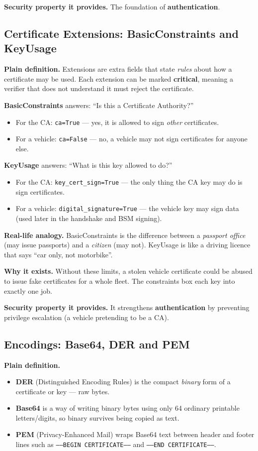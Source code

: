 \documentclass[11pt,a4paper]{article}
\begin{document}
\textbf{Security property it provides.} The foundation of \textbf{authentication}.

\subsection{Certificate Extensions: BasicConstraints and KeyUsage}
\textbf{Plain definition.} Extensions are extra fields that state \emph{rules}
about how a certificate may be used. Each extension can be marked
\textbf{critical}, meaning a verifier that does not understand it must reject the
certificate.

\textbf{BasicConstraints} answers: ``Is this a Certificate Authority?''
\begin{itemize}
  \item For the CA: \texttt{ca=True} --- yes, it is allowed to sign \emph{other}
        certificates.
  \item For a vehicle: \texttt{ca=False} --- no, a vehicle may not sign
        certificates for anyone else.
\end{itemize}

\textbf{KeyUsage} answers: ``What is this key allowed to do?''
\begin{itemize}
  \item For the CA: \texttt{key\_cert\_sign=True} --- the only thing the CA key
        may do is sign certificates.
  \item For a vehicle: \texttt{digital\_signature=True} --- the vehicle key may
        sign data (used later in the handshake and BSM signing).
\end{itemize}

\textbf{Real-life analogy.} BasicConstraints is the difference between a
\emph{passport office} (may issue passports) and a \emph{citizen} (may not).
KeyUsage is like a driving licence that says ``car only, not motorbike''.

\textbf{Why it exists.} Without these limits, a stolen vehicle certificate could
be abused to issue fake certificates for a whole fleet. The constraints box each
key into exactly one job.

\textbf{Security property it provides.} It strengthens \textbf{authentication}
by preventing privilege escalation (a vehicle pretending to be a CA).

\subsection{Encodings: Base64, DER and PEM}
\textbf{Plain definition.}
\begin{itemize}
  \item \textbf{DER} (Distinguished Encoding Rules) is the compact \emph{binary}
        form of a certificate or key --- raw bytes.
  \item \textbf{Base64} is a way of writing binary bytes using only 64 ordinary
        printable letters/digits, so binary survives being copied as text.
  \item \textbf{PEM} (Privacy-Enhanced Mail) wraps Base64 text between header and
        footer lines such as \texttt{-----BEGIN CERTIFICATE-----} and
        \texttt{-----END CERTIFICATE-----}.
\end{itemize}
\end{document}
